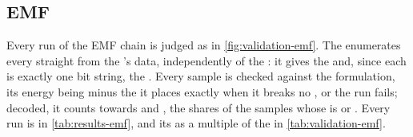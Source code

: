 \subsection*{EMF}

Every run of the EMF chain is judged as in \cref{fig:validation-emf}. The  enumerates every
 straight from the 's data, independently of the : it gives the 
 and, since each  is exactly one bit string, the . Every sample is checked
against the formulation, its energy being minus the  it places exactly when it breaks no
, or the run fails; decoded, it counts towards  and , the
shares of the samples whose  is  or . Every run is in
\cref{tab:results-emf}, and its  as a multiple of the  in \cref{tab:validation-emf}.

